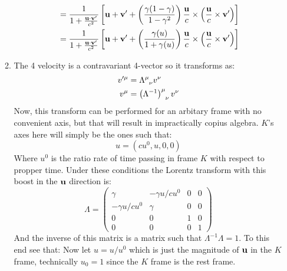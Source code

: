 \documentclass[12pt,a4]{article}
\begin{document}
\begin{enumerate}
\begin{enumerate}
\begin{align*}
                  &= \frac{1}{1 + \frac{{\bf u} \cdot {\bf v}'}{c^2}} \left[ {\bf u} + {\bf v'} + \left(\frac{\gamma (1 - \gamma)}{ 1 - \gamma^2} \right) \frac{\bf u}{c} \times \left(\frac{\bf u}{c} \times {\bf v}'\right)\right]\\
                  &= \frac{1}{1 + \frac{{\bf u} \cdot {\bf v}'}{c^2}} \left[ {\bf u} + {\bf v'} + \left(\frac{\gamma(u) }{ 1 + \gamma(u)} \right) \frac{\bf u}{c} \times \left(\frac{\bf u}{c} \times {\bf v}'\right)\right]\\
        \end{align*}
      \item
        The 4 velocity is a contravariant 4-vector so it transforms as:
        \begin{align*}
          v'^\mu &= \tensor{\Lambda}{^{\mu}_\nu} v^\nu\\
          v^\mu &= \tensor{\left(\Lambda^{-1}\right)}{^{\mu}_\nu} v^\nu
        \end{align*}
        Now, this transform can be performed for an arbitary frame with no convenient axis, but that will result in impractically copius algebra. $K$'s axes here will simply be the ones such that:
        \begin{equation*}
          u = \left(
                cu^0, u, 0, 0
              \right)
        \end{equation*}
        Where $u^0$ is the ratio rate of time passing in frame $K$ with respect to propper time.
        Under these conditions the Lorentz transform with this boost in the ${\bf u}$ direction is:
        \begin{equation*}
          \Lambda = \left(\begin{matrix}
                      \gamma          &         -\gamma u / cu^0 & 0 & 0\\ 
                      -\gamma u / cu^0 & \gamma                 & 0 & 0\\ 
                      0               & 0                      & 1 & 0\\ 
                      0               & 0                      & 0 & 1
                    \end{matrix}\right)
        \end{equation*}
        And the inverse of this matrix is a matrix such that $\Lambda^{-1}\Lambda = 1$. To this end see that:
        Now let $u = u / u^0$ which is just the magnitude of ${\bf u}$ in the $K$ frame, technically $u_0 = 1$ since the $K$ frame is the rest frame.
        \begin{equation*}

\end{equation*}
\end{enumerate}
\end{enumerate}
\end{document}
